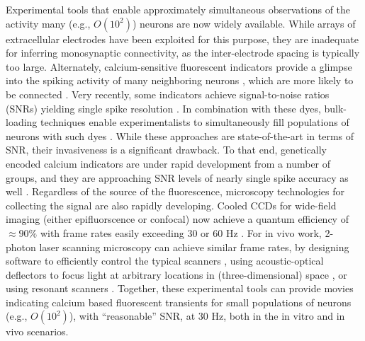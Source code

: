 Experimental tools that enable approximately simultaneous observations of the activity many (e.g., $O(10^2)$) neurons are now widely available.  While arrays of extracellular electrodes have been exploited for this purpose, they are inadequate for inferring monosynaptic connectivity, as the inter-electrode spacing is typically too large.  Alternately, calcium-sensitive fluorescent indicators provide a glimpse into the spiking activity of many neighboring neurons \cite{Tsien89}, which are more likely to be connected \cite{BraitenbergShutz91}. Very recently, some indicators achieve signal-to-noise ratios (SNRs) yielding single spike resolution \cite{??}.  In combination with these dyes, bulk-loading techniques enable experimentalists to simultaneously fill populations of neurons with such dyes \cite{??}.  While these approaches are state-of-the-art in terms of SNR, their invasiveness is a significant drawback.  To that end, genetically encoded calcium indicators are under rapid development from a number of groups, and they are approaching SNR levels of nearly single spike accuracy as well \cite{??}. Regardless of the source of the fluorescence, microscopy technologies for collecting the signal are also rapidly developing.  Cooled CCDs for wide-field imaging (either epifluorscence or confocal) now achieve a quantum efficiency of $\approx 90 \%$ with frame rates easily exceeding $30$ or $60$ Hz \cite{redshirt}.  For in vivo work, 2-photon laser scanning microscopy can achieve similar frame rates, by designing software to efficiently control the typical scanners \cite{??}, using acoustic-optical deflectors to focus light at arbitrary locations in (three-dimensional) space \cite{??}, or using resonant scanners \cite{??}.  Together, these experimental tools can provide movies indicating calcium based fluorescent transients for small populations of neurons (e.g., $O(10^2)$), with ``reasonable'' SNR, at 30 Hz, both in the in vitro and in vivo scenarios.  

